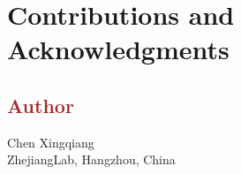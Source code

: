 \newpage
\section{Contributions and Acknowledgments}

\subsection*{\textcolor{brown}{Author}}
Chen Xingqiang \\
ZhejiangLab, Hangzhou, China

